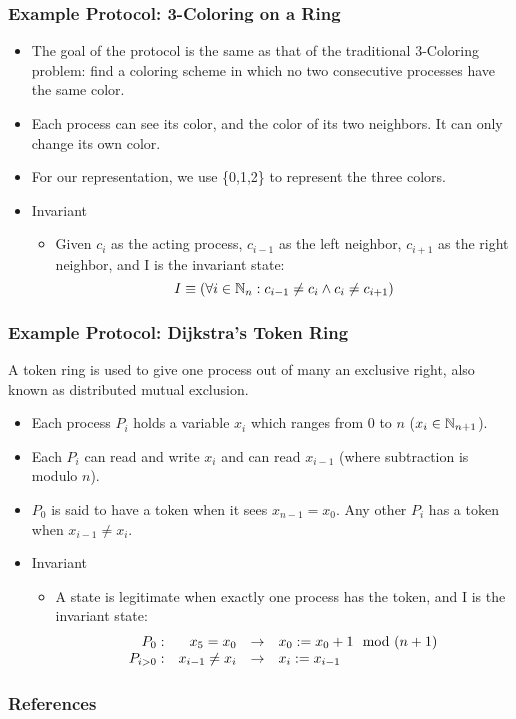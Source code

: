 \documentclass[handout]{beamer}
\begin{document}
\begin{frame}
\frametitle{Example Protocol: 3-Coloring on a Ring}
\begin{itemize}
\item The goal of the protocol is the same as that of the traditional 3-Coloring problem: find a 
    coloring scheme in which no two consecutive processes have the same color.
\item Each process can see its color, and the color of its two neighbors.  It can only change its
    own color.
\item For our representation, we use \{0,1,2\} to represent the three colors.
\item Invariant
 \begin{itemize}
 \item Given $c_i$ as the acting process, $c_{i-1}$ as the left neighbor, $c_{i+1}$ as the right
    neighbor, and I is the invariant state: 
    \[ I \equiv (\forall i\in\mathbb{N}_n: c_{i-1}\ne c_i \wedge c_i \ne c_{i+1}) \]
 \end{itemize}
\end{itemize}
\end{frame}

\begin{frame}
\frametitle{Example Protocol: Dijkstra's Token Ring}
A token ring is used to give one process out of many an exclusive right, also   known as distributed mutual exclusion.
\end{frame}

\begin{frame}
\begin{itemize}
\item Each process $P_i$ holds a variable $x_i$ which ranges from $0$ to $n$ ($x_i\in\mathbb{N}_{n+1}$). 
\item Each $P_i$ can read and write $x_i$ and can read $x_{i-1}$ (where subtraction   is modulo $n$). 
\item $P_0$ is said to have a token when it sees $x_{n-1} = x_0$. Any other $P_i$ has a token when $x_{i-1} \neq x_i$. 
\item Invariant
 \begin{itemize}
 \item A state is legitimate when exactly one process has the token, and I is the invariant state: 
\[ 
      \begin{array}{rrcl} 
         P_0: & x_{5} = x_0 & \to & x_0 := x_0 + 1 \mod (n+1) 
  \\ P_{i>0}: & x_{i-1} \neq x_i & \to & x_i := x_{i-1} 
      \end{array} 
\] 
 \end{itemize}
\end{itemize}
\end{frame}

\begin{frame}[allowframebreaks]
\frametitle{References}


\end{frame}
\end{document}
